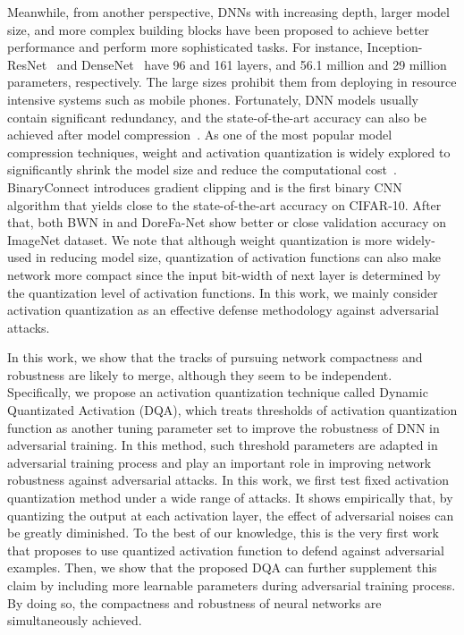 \documentclass{article}
\begin{document}
Meanwhile, from another perspective, DNNs with increasing depth, larger model size, and more complex building blocks have been proposed to achieve better performance and perform more sophisticated tasks. For instance, Inception-ResNet~\cite{szegedy2017inception} and DenseNet~\cite{huang2017densely} have 96 and 161 layers, and 56.1 million and 29 million parameters, respectively. The large sizes prohibit them from deploying in resource intensive systems such as mobile phones. Fortunately, DNN models usually contain significant redundancy, and the state-of-the-art accuracy can also be achieved after model compression~\cite{han2015deep}. 
As one of the most popular model compression techniques, weight and activation quantization is widely explored to significantly shrink the model size and reduce the computational cost~\cite{courbariaux2015binaryconnect,rastegari2016xnor,zhou2016dorefa}. BinaryConnect \cite{courbariaux2015binaryconnect} introduces gradient clipping and is the first binary CNN algorithm that yields close to the state-of-the-art accuracy on CIFAR-10. After that, both BWN in \cite{rastegari2016xnor} and DoreFa-Net \cite{zhou2016dorefa} show better or close validation accuracy on ImageNet dataset. We note that although weight quantization is more widely-used in reducing model size, quantization of activation functions can also make network more compact since the input bit-width of next layer is determined by the quantization level of activation functions. In this work, we mainly consider activation quantization as an effective defense methodology against adversarial attacks. 

In this work, we show that the tracks of pursuing network compactness and robustness are likely to merge, although they seem to be independent. Specifically, we propose an activation quantization technique called Dynamic Quantizated Activation (DQA), which treats thresholds of activation quantization function as another tuning parameter set to improve the robustness of DNN in adversarial training. In this method, such threshold parameters are adapted in adversarial training process and play an important role in improving network robustness against adversarial attacks. In this work, we first test fixed activation quantization method under a wide range of attacks. It shows empirically that, by quantizing the output at each activation layer, the effect of adversarial noises can be greatly diminished. To the best of our knowledge, this is the very first work that proposes to use quantized activation function to defend against adversarial examples. Then, we show that the proposed DQA can further supplement this claim by including more learnable parameters during adversarial training process. By doing so, the compactness and robustness of neural networks are simultaneously achieved.
\end{document}
